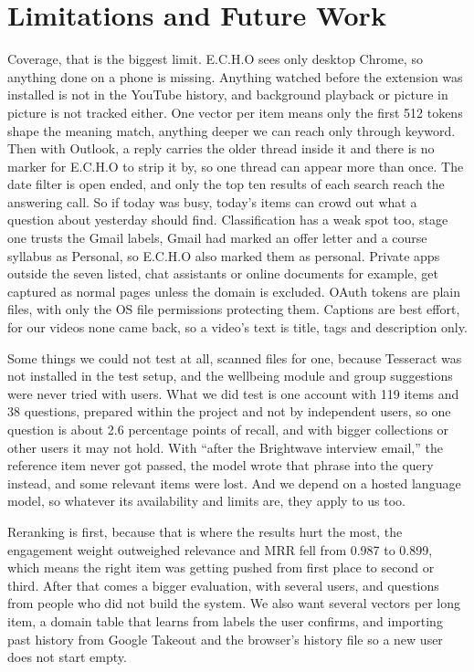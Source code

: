 \documentclass[conference]{IEEEtran}
\begin{document}
\section{Limitations and Future Work}\label{sec:limits}
Coverage, that is the biggest limit. E.C.H.O sees only desktop Chrome, so anything done on a phone is missing. Anything watched before the extension was installed is not in the YouTube history, and background playback or picture in picture is not tracked either. One vector per item means only the first 512 tokens shape the meaning match, anything deeper we can reach only through keyword. Then with Outlook, a reply carries the older thread inside it and there is no marker for E.C.H.O to strip it by, so one thread can appear more than once. The date filter is open ended, and only the top ten results of each search reach the answering call. So if today was busy, today's items can crowd out what a question about yesterday should find. Classification has a weak spot too, stage one trusts the Gmail labels, Gmail had marked an offer letter and a course syllabus as Personal, so E.C.H.O also marked them as personal. Private apps outside the seven listed, chat assistants or online documents for example, get captured as normal pages unless the domain is excluded. OAuth tokens are plain files, with only the OS file permissions protecting them. Captions are best effort, for our videos none came back, so a video's text is title, tags and description only.

Some things we could not test at all, scanned files for one, because Tesseract was not installed in the test setup, and the wellbeing module and group suggestions were never tried with users. What we did test is one account with 119 items and 38 questions, prepared within the project and not by independent users, so one question is about 2.6 percentage points of recall, and with bigger collections or other users it may not hold. With ``after the Brightwave interview email,'' the reference item never got passed, the model wrote that phrase into the query instead, and some relevant items were lost. And we depend on a hosted language model, so whatever its availability and limits are, they apply to us too.

Reranking is first, because that is where the results hurt the most, the engagement weight outweighed relevance and MRR fell from 0.987 to 0.899, which means the right item was getting pushed from first place to second or third. After that comes a bigger evaluation, with several users, and questions from people who did not build the system. We also want several vectors per long item, a domain table that learns from labels the user confirms, and importing past history from Google Takeout and the browser's history file so a new user does not start empty.
\end{document}
